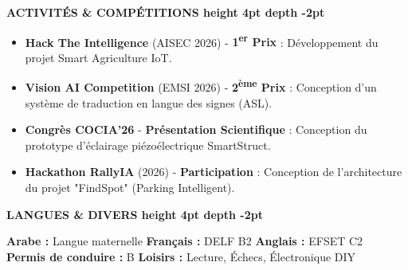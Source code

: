 \documentclass[10pt,a4paper]{altacv}
\renewcommand{\cvsection}[2][]{%
  \vspace{3pt}%
  {\color{heading}\LARGE\bfseries #2 \hspace{0.2em}\leaders\vrule height 4pt depth -2pt\hfill\mbox{}}\par\vspace{2pt}
}
\begin{document}
\cvsection{ACTIVITÉS \& COMPÉTITIONS}
\begin{itemize}[leftmargin=*, label=\textbullet, itemsep=2pt]
  \item \textbf{Hack The Intelligence} (AISEC 2026) - \textbf{1\textsuperscript{er} Prix} : {\small Développement du projet Smart Agriculture IoT.}
  \item \textbf{Vision AI Competition} (EMSI 2026) - \textbf{2\textsuperscript{ème} Prix} : {\small Conception d'un système de traduction en langue des signes (ASL).}
  \item \textbf{Congrès COCIA'26} - \textbf{Présentation Scientifique} : {\small Conception du prototype d'éclairage piézoélectrique SmartStruct.}
  \item \textbf{Hackathon RallyIA} (2026) - \textbf{Participation} : {\small Conception de l'architecture du projet "FindSpot" (Parking Intelligent).}
\end{itemize}


\cvsection{LANGUES \& DIVERS}
\textbf{Arabe :} Langue maternelle \hfill \textbf{Français :} DELF B2 \hfill \textbf{Anglais :} EFSET C2\\[2pt]
\textbf{Permis de conduire :} B \hfill \textbf{Loisirs :} Lecture, Échecs, Électronique DIY
\end{document}
